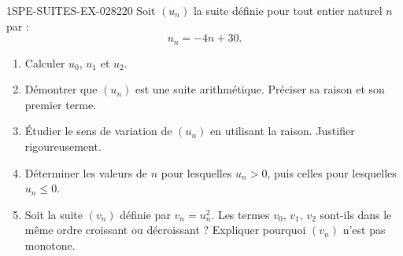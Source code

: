 \begin{exercice}{1SPE-SUITES-EX-028}{2}{20}
Soit $(u_n)$ la suite définie pour tout entier naturel $n$ par :
\[
  u_n = -4n + 30.
\]

\begin{enumerate}
  \item Calculer $u_0$, $u_1$ et $u_2$.

  \item Démontrer que $(u_n)$ est une suite arithmétique. Préciser sa raison et son premier terme.

  \item Étudier le sens de variation de $(u_n)$ en utilisant la raison. Justifier rigoureusement.

  \item Déterminer les valeurs de $n$ pour lesquelles $u_n > 0$, puis celles pour lesquelles $u_n \leq 0$.

  \item Soit la suite $(v_n)$ définie par $v_n = u_n^2$. Les termes $v_0$, $v_1$, $v_2$ sont-ils dans le même ordre croissant ou décroissant ? Expliquer pourquoi $(v_n)$ n'est pas monotone.
\end{enumerate}
\end{exercice}
